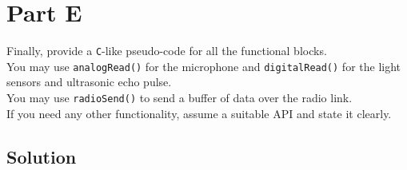 \section*{Part E}

Finally, provide a \texttt{C}-like pseudo-code for all the functional blocks. \\
You may use \texttt{analogRead\@()} for the microphone and \texttt{digitalRead\@()} for the light sensors and ultrasonic echo pulse. \\
You may use \texttt{radioSend\@()} to send a buffer of data over the radio link. \\
If you need any other functionality, assume a suitable API and state it clearly.

\subsection*{Solution}
